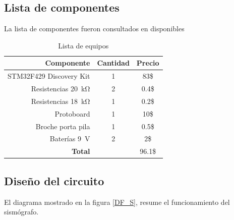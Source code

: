 \subsection*{Lista de componentes}
La lista de componentes fueron consultados en \cite{web2} disponibles
\begin{table}[H]
\caption{Lista de equipos}
\label{table_2}
\begin{center}
\begin{tabular}{r|cc}
\hline
\textbf{Componente}&\textbf{Cantidad}&\textbf{Precio}\\
 \hline
STM32F429 Discovery Kit& 1 & 83\$ \\ \hline 
Resistencias \SI{20}{\kilo\ohm}&2 & 0.4\$ \\ \hline 
Resistencias \SI{18}{\kilo\ohm}&1 & 0.2\$ \\ \hline 
Protoboard &1 &10\$ \\ \hline 
Broche porta pila &1 &0.5\$ \\ \hline 
Baterías \SI{9}{\volt} & 2& 2\$ \\ \hline 

 \textbf{Total}& & 96.1\$ \\
 \hline
\end{tabular}
\end{center}
\end{table}

\subsection*{Diseño del circuito}
El diagrama mostrado en la figura \ref{DF_S}, resume el funcionamiento del sismógrafo.

\newpage
